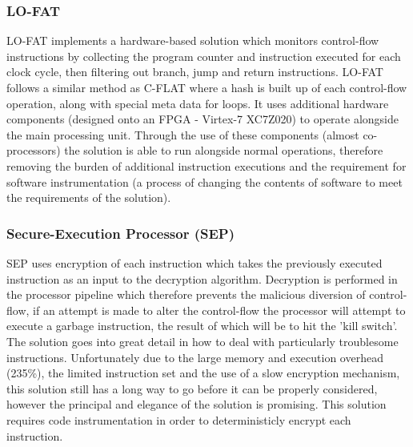 \subsubsection{LO-FAT}
LO-FAT \cite{Dessouky2017} implements a hardware-based solution which monitors control-flow instructions by collecting the program counter and instruction executed for each clock cycle, then filtering out branch, jump and return instructions. LO-FAT follows a similar method as C-FLAT where a hash is built up of each control-flow operation, along with special meta data for loops. It uses additional hardware components (designed onto an FPGA - Virtex-7 XC7Z020) to operate alongside the main processing unit. Through the use of these components (almost co-processors) the solution is able to run alongside normal operations, therefore removing the burden of additional instruction executions and the requirement for software instrumentation (a process of changing the contents of software to meet the requirements of the solution).

\subsubsection{Secure-Execution Processor (SEP)}
SEP \cite{Lee2019} uses encryption of each instruction which takes the previously executed instruction as an input to the decryption algorithm. Decryption is performed in the processor pipeline which therefore prevents the malicious diversion of control-flow, if an attempt is made to alter the control-flow the processor will attempt to execute a garbage instruction, the result of which will be to hit the 'kill switch'. The solution goes into great detail in how to deal with particularly troublesome instructions. Unfortunately due to the large memory and execution overhead (235\%), the limited instruction set and the use of a slow encryption mechanism, this solution still has a long way to go before it can be properly considered, however the principal and elegance of the solution is promising. This solution requires code instrumentation in order to deterministicly encrypt each instruction.

